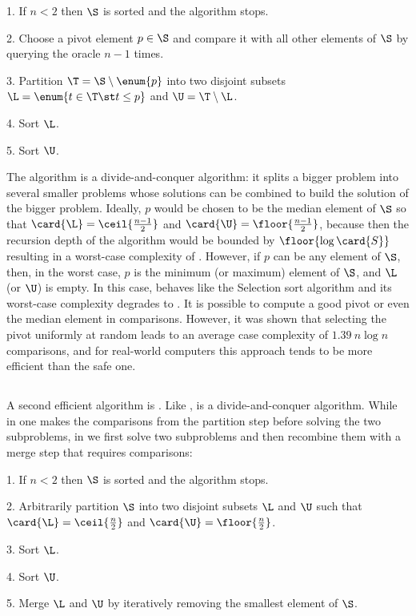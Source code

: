 \begin{algorithm}
\item[1.] If \(n < 2\) then \(\S\) is sorted and the algorithm stops.
\item[2.] Choose a pivot element \(p \in \S\) and compare it with all other
elements of \(\S\) by querying the oracle \(n - 1\) times.
\item[3.] Partition \(\T = \S \setminus \enum{p}\) into two disjoint subsets
\(\L = \enum{t \in \T \st t \le p}\) and \(\U = \T \setminus \L\).
\item[4.] Sort \(\L\).
\item[5.] Sort \(\U\).
\end{algorithm}

The \quicksort algorithm is a divide-and-conquer algorithm: it splits a bigger
problem into several smaller problems whose solutions can be combined to build
the solution of the bigger problem. Ideally, \(p\) would be chosen to be the
median element of \(\S\) so that \(\card{\L} = \ceil{\frac{n-1}{2}}\) and
\(\card{\U} = \floor{\frac{n-1}{2}}\), because then the recursion depth of the
algorithm would be bounded by \(\floor{\log \card{S}}\) resulting in a
worst-case complexity of . However, if \(p\) can be any element
of \(\S\), then, in the worst case, \(p\) is the minimum (or maximum) element of
\(\S\), and \(\L\) (or \(\U\)) is empty. In this case, \quicksort behaves like
the Selection sort algorithm and its worst-case complexity degrades to
. It is possible \cite{blum:1973} to compute a good pivot or even the
median element in  comparisons. However, it was shown \cite{hoare:1962}
that selecting the pivot uniformly at random leads to an average case
complexity of \(1.39~n \log n\) comparisons, and for real-world computers this
approach tends to be more efficient than the safe one.

\subsection*{\mergesort}

A second efficient algorithm is \mergesort
\cite{goldstine:1948,leiserson:2001}. Like \quicksort, \mergesort is a
divide-and-conquer algorithm. While in \quicksort one makes the comparisons from
the partition step before solving the two subproblems, in \mergesort we
first solve two subproblems and then recombine them with a merge step that
requires  comparisons:

\begin{algorithm}
\item[1.] If \(n < 2\) then \(\S\) is sorted and the algorithm stops.
\item[2.] Arbitrarily partition \(\S\) into two disjoint subsets \(\L\) and
\(\U\) such that \(\card{\L} = \ceil{\frac{n}{2}}\) and \(\card{\U} =
\floor{\frac{n}{2}}\).
\item[3.] Sort \(\L\).
\item[4.] Sort \(\U\).
\item[5.] Merge \(\L\) and \(\U\) by iteratively removing the smallest element
of \(\S\).
\end{algorithm}

